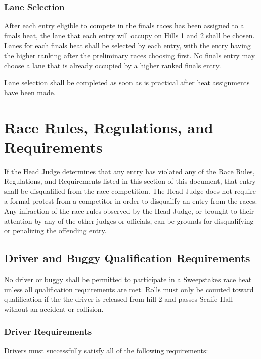 \subsubsection{Lane Selection}

	After each entry eligible to compete in the finals races has been assigned to a finals heat, the lane that each entry will occupy on Hills 1 and 2 shall be chosen. Lanes for each finals heat shall be selected by each entry, with the entry having the higher ranking after the preliminary races choosing first. No finals entry may choose a lane that is already occupied by a higher ranked finals entry.

	Lane selection shall be completed as soon as is practical after heat assignments have been made.

\section{Race Rules, Regulations, and Requirements}

	If the Head Judge determines that any entry has violated any of the Race Rules, Regulations, and Requirements listed in this section of this document, that entry shall be disqualified from the race competition. The Head Judge does not require a formal protest from a competitor in order to disqualify an entry from the races. Any infraction of the race rules observed by the Head Judge, or brought to their attention by any of the other judges or officials, can be grounds for disqualifying or penalizing the offending entry.

\subsection{Driver and Buggy Qualification Requirements}
	No driver or buggy shall be permitted to participate in a Sweepstakes race heat unless all qualification requirements are met. Rolls must only be counted toward qualification if the the driver is released from hill 2 and passes Scaife Hall
\label{sec:DriverAndBuggyQualificationRequirements}
	without an accident or collision.

\subsubsection{Driver Requirements}
Drivers must successfully satisfy all of the following requirements:


